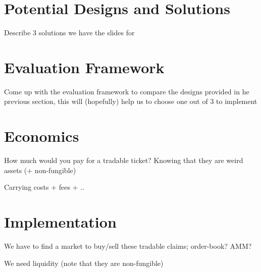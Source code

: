 \section{Potential Designs and Solutions}
	Describe 3 solutions we have the slides for 

\section{Evaluation Framework}
	Come up with the evaluation framework to compare the designs provided in he previous section, this will (hopefully) help us to choose one out of 3 to implement

\section{Economics}
	How much would you pay for a tradable ticket? Knowing that they are weird assets (+ non-fungible)\par
 Carrying costs + fees + ..


\section{Implementation}

 We have to find a market to buy/sell these tradable claims; order-book? AMM? \par
 We need liquidity (note that they are non-fungible)








